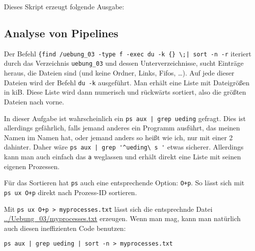 \documentclass[10pt]{article}
\begin{document}
Dieses Skript erzeugt folgende Ausgabe:




\subsection{Analyse von Pipelines}

Der Befehl \verb#{find /uebung_03 -type f -exec du -k {} \;| sort -n -r# iteriert durch das Verzeichnis \verb#uebung_03# und dessen Unterverzeichnisse, sucht Einträge heraus, die Dateien sind (und keine Ordner, Links, Fifos, …). Auf jede dieser Dateien wird der Befehl \texttt{du -k} ausgeführt. Man erhält eine Liste mit Dateigrößen in kiB. Diese Liste wird dann numerisch und rückwärts sortiert, also die größten Dateien nach vorne.


In dieser Aufgabe ist wahrscheinlich ein \verb#ps aux | grep ueding# gefragt. Dies ist allerdings gefährlich, falls jemand anderes ein Programm ausführt, das meinen Namen im Namen hat, oder jemand anders so heißt wie ich, nur mit einer 2 dahinter. Daher wäre \verb#ps aux | grep '^ueding\ s '# etwas sicherer. Allerdings kann man auch einfach das \texttt{a} weglassen und erhält direkt eine Liste mit seinen eigenen Prozessen.

Für das Sortieren hat \texttt{ps} auch eine entsprechende Option: \texttt{O+p}. So lässt sich mit \texttt{ps ux O+p} direkt nach Prozess-ID sortieren.

Mit \verb#ps ux O+p > myprocesses.txt# lässt sich die entsprechnde Datei \url{../Uebung_03/myprocesses.txt} erzeugen. Wenn man mag, kann man natürlich auch diesen ineffizienten Code benutzen:
\begin{lstlisting}
ps aux | grep ueding | sort -n > myprocesses.txt
\end{lstlisting}




\newpage
\end{document}
